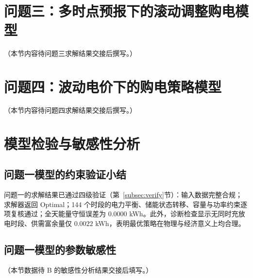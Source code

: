 \documentclass[zihao=-4,a4paper,UTF8,fontset=none]{ctexart}
\begin{document}
\section{问题三：多时点预报下的滚动调整购电模型}

（本节内容待问题三求解结果交接后撰写。）

\section{问题四：波动电价下的购电策略模型}

（本节内容待问题四求解结果交接后撰写。）

\section{模型检验与敏感性分析}

\subsection{问题一模型的约束验证小结}

问题一的求解结果已通过四级验证（第~\ref{subsec:verify}节）：输入数据完整合规；求解器返回 Optimal；144 个时段的电力平衡、储能状态转移、容量与功率约束逐项复核通过；全天能量守恒误差为 $0.0000$ kWh。此外，诊断检查显示无同时充放电时段、供需富余量仅 $0.0022$ kWh，表明最优策略在物理与经济意义上均合理。

\subsection{问题一模型的参数敏感性}

（本节数据待 B 的敏感性分析结果交接后填写。）
\end{document}
